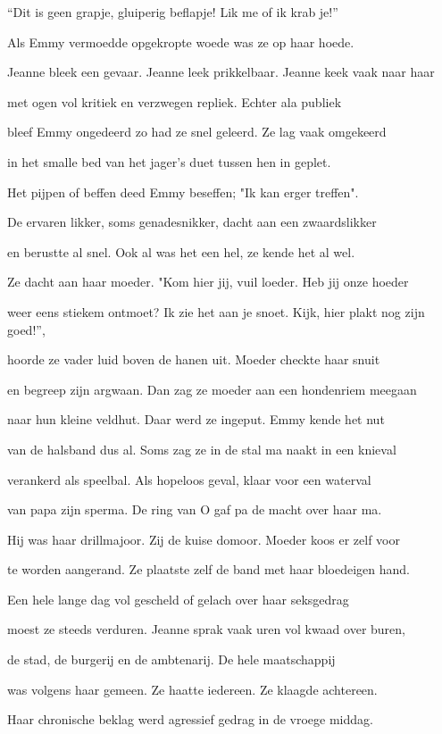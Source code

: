 “Dit is geen grapje,
gluiperig beflapje!
Lik me of ik krab je!”

Als Emmy vermoedde
opgekropte woede
was ze op haar hoede.

Jeanne bleek een gevaar.
Jeanne leek prikkelbaar.
Jeanne keek vaak naar haar

met ogen vol kritiek
en verzwegen repliek.
Echter ala publiek

bleef Emmy ongedeerd
zo had ze snel geleerd.
Ze lag vaak omgekeerd

in het smalle bed
van het jager’s duet
tussen hen in geplet.

Het pijpen of beffen
deed Emmy beseffen;
"Ik kan erger treffen".

De ervaren likker,
soms genadesnikker,
dacht aan een zwaardslikker

en berustte al snel.
Ook al was het een hel,
ze kende het al wel.

Ze dacht aan haar moeder. 
"Kom hier jij, vuil loeder.
Heb jij onze hoeder

weer eens stiekem ontmoet?
Ik zie het aan je snoet.
Kijk, hier plakt nog zijn goed!”,

hoorde ze vader luid
boven de hanen uit.
Moeder checkte haar snuit

en begreep zijn argwaan.
Dan zag ze moeder aan
een hondenriem meegaan

naar hun kleine veldhut.
Daar werd ze ingeput.
Emmy kende het nut

van de halsband dus al.
Soms zag ze in de stal
ma naakt in een knieval

verankerd als speelbal.
Als hopeloos geval,
klaar voor een waterval

van papa zijn sperma.
De ring van O gaf pa
de macht over haar ma.

Hij was haar drillmajoor.
Zij de kuise domoor.
Moeder koos er zelf voor

te worden aangerand.
Ze plaatste zelf de band
met haar bloedeigen hand.

Een hele lange dag
vol gescheld of gelach
over haar seksgedrag

moest ze steeds verduren.
Jeanne sprak vaak uren
vol kwaad over buren,

de stad, de burgerij
en de ambtenarij.
De hele maatschappij

was volgens haar gemeen.
Ze haatte iedereen.
Ze klaagde achtereen.

Haar chronische beklag
werd agressief gedrag
in de vroege middag.

